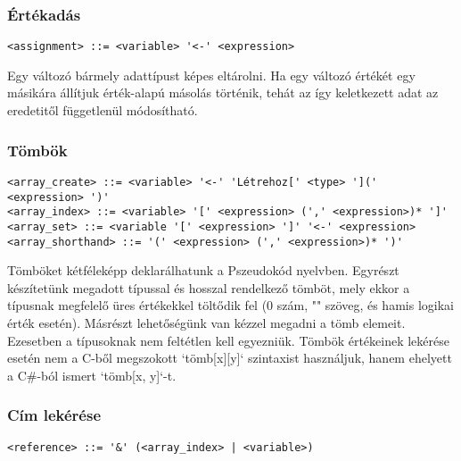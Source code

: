 \subsubsection{Értékadás}

\begin{footnotesize}
\begin{verbatim}
<assignment> ::= <variable> '<-' <expression>
\end{verbatim}
\end{footnotesize}

Egy változó bármely adattípust képes eltárolni. Ha egy változó értékét egy másikára állítjuk érték-alapú másolás történik, tehát az így keletkezett adat az eredetitől függetlenül módosítható.

\subsubsection{Tömbök}

\begin{footnotesize}
\begin{verbatim}
<array_create> ::= <variable> '<-' 'Létrehoz[' <type> '](' <expression> ')'
<array_index> ::= <variable> '[' <expression> (',' <expression>)* ']'
<array_set> ::= <variable '[' <expression> ']' '<-' <expression>
<array_shorthand> ::= '(' <expression> (',' <expression>)* ')'
\end{verbatim}
\end{footnotesize}

Tömböket kétféleképp deklarálhatunk a Pszeudokód nyelvben. Egyrészt készítetünk megadott típussal és hosszal rendelkező tömböt, mely ekkor a típusnak megfelelő üres értékekkel töltődik fel (0 szám, "" szöveg, és hamis logikai érték esetén). Másrészt lehetőségünk van kézzel megadni a tömb elemeit. Ezesetben a típusoknak nem feltétlen kell egyezniük. Tömbök értékeinek lekérése esetén nem a C-ből megszokott `tömb[x][y]` szintaxist használjuk, hanem ehelyett a C\#-ból ismert `tömb[x, y]`-t.

\subsubsection{Cím lekérése}

\begin{footnotesize}
\begin{verbatim}
<reference> ::= '&' (<array_index> | <variable>)
\end{verbatim}
\end{footnotesize}

